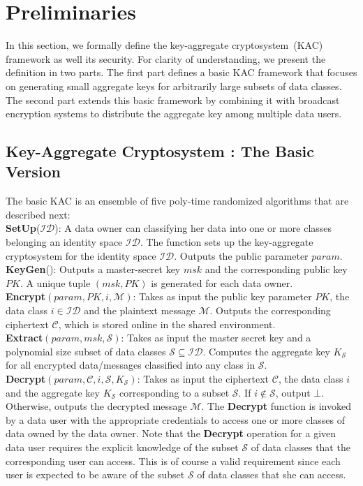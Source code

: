 \section{Preliminaries}
\label{sec:prelims}

In this section, we formally define the key-aggregate cryptosystem~(KAC) framework as well its security. For clarity of understanding, we present the definition in two parts. The first part defines a basic KAC framework that focuses on generating small aggregate keys for arbitrarily large subsets of data classes. The second part extends this basic framework by combining it with broadcast encryption systems to distribute the aggregate key among multiple data users.

\subsection{Key-Aggregate Cryptosystem : The Basic Version}
\label{subsec:basic_framework}

The basic KAC is an ensemble of five poly-time randomized algorithms that are described next:\\

\noindent\textbf{SetUp}($\mathcal{ID}$): A data owner can classifying her data into one or more classes belonging an identity space $\mathcal{ID}$. The function sets up the key-aggregate cryptosystem for the identity space $\mathcal{ID}$. Outputs the public parameter $param$. \\

\noindent\textbf{KeyGen}(): Outputs a master-secret key $msk$ and the corresponding public key $PK$. A unique tuple $(msk,PK)$ is generated for each data owner.\\ 

\noindent\textbf{Encrypt}$(param,PK,i,\mathcal{M})$: Takes as input the public key parameter $PK$, the data class $i\in\mathcal{ID}$ and the plaintext message $\mathcal{M}$. Outputs the corresponding ciphertext $\mathcal{C}$, which is stored online in the shared environment.\\

\noindent\textbf{Extract}$(param,msk,\mathcal{S})$: Takes as input the master secret key and a polynomial size subset of data classes $\mathcal{S} \subseteq\mathcal{ID}$. Computes the aggregate key $K_{\mathcal{S}}$ for all encrypted data/messages classified into any class in $\mathcal{S}$.\\

\noindent\textbf{Decrypt}$(param,\mathcal{C},i,\mathcal{S},K_{\mathcal{S}})$: Takes as input the ciphertext $\mathcal{C}$, the data class $i$ and the aggregate key $K_{\mathcal{S}}$ corresponding to a subset $\mathcal{S}$. If $i\notin\mathcal{S}$, output $\bot$. Otherwise, outputs the decrypted message $\mathcal{M}$. The \textbf{Decrypt} function is invoked by a data user with the appropriate credentials to access one or more classes of data owned by the data owner. Note that the \textbf{Decrypt} operation for a given data user requires the explicit knowledge of the subset $\mathcal{S}$ of data classes that the corresponding user can access. This is of course a valid requirement since each user is expected to be aware of the subset $\mathcal{S}$ of data classes that she can access.

